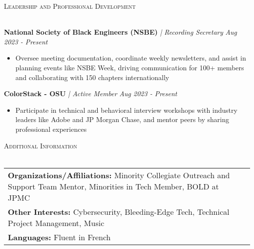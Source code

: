 \documentclass[letterpaper]{article}
\newcommand{\lineunder} {
    \vspace*{-8pt} \\
    \hspace*{-18pt} \hrulefill \\
}
\newcommand{\header} [1] {
    {\hspace*{-18pt}\vspace*{6pt} \textsc{#1}}
    \vspace*{-6pt} \lineunder
}
\begin{document}
\header{Leadership and Professional Development}
\vspace{1mm}

    \textbf{National Society of Black Engineers (NSBE)} \textit{| Recording Secretary} \hfill \textsl{Aug 2023 - Present}\\
    \vspace{-2mm}
    \begin{itemize} \itemsep -1mm
    
        \item Oversee meeting documentation, coordinate weekly newsletters, and assist in planning events like NSBE Week, driving communication for 100+ members and collaborating with 150 chapters internationally
        
    \end{itemize}
    \vspace{-1mm}

    \textbf{ColorStack - OSU} \textit{| Active Member} \hfill \textsl{Aug 2023 - Present}\\
    \vspace{-2mm}
    \begin{itemize} \itemsep -1mm
    
        \item Participate in technical and behavioral interview workshops with industry leaders like Adobe and JP Morgan Chase, and mentor peers by sharing professional experiences
        
    \end{itemize}
    \vspace{-1mm}

\header{Additional Information}
\vspace{1mm}
\hspace{-3mm}
\begin{tabular}{ l l }

    \textbf{Organizations/Affiliations:} Minority Collegiate Outreach and Support Team Mentor, Minorities in Tech Member, BOLD at JPMC \\

    \textbf{Other Interests:} Cybersecurity, Bleeding-Edge Tech, Technical Project Management, Music \\

    \textbf{Languages:} Fluent in French \\

\end{tabular}
\vspace{2mm}
\end{document}
